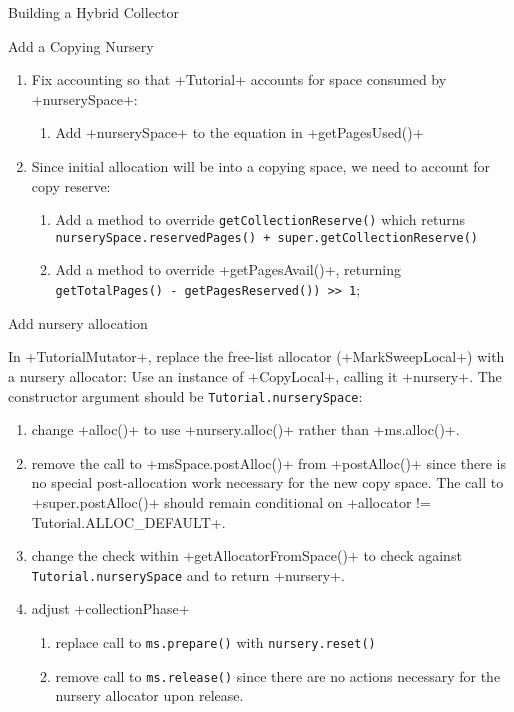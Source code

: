 \begin{section}{Building a Hybrid Collector}
\begin{subsection}{Add a Copying Nursery}
\begin{enumerate}
\begin{enumerate}
      \item Fix accounting so that \spverb+Tutorial+ accounts for space consumed by \spverb+nurserySpace+:
         \begin{enumerate}
           \item Add \spverb+nurserySpace+ to the equation in \spverb+getPagesUsed()+
         \end{enumerate}
      \item Since initial allocation will be into a copying space, we need to account for copy reserve:
         \begin{enumerate}
           \item Add a method to override \texttt{get\-Col\-lec\-tion\-Re\-serve()} which returns \texttt{nur\-se\-ry\-Spa\-ce.re\-ser\-ved\-Pa\-ges() + su\-per.get\-Col\-lec\-tion\-Re\-ser\-ve()}
           \item Add a method to override \spverb+getPagesAvail()+, returning \texttt{get\-To\-tal\-Pa\-ges() - get\-Pa\-ges\-Re\-ser\-ved()) >> 1};
         \end{enumerate}
    \end{enumerate}
\end{enumerate}

\end{subsection}

\begin{subsection}{Add nursery allocation}

In \spverb+TutorialMutator+, replace the free-list allocator (\spverb+MarkSweepLocal+) with a nursery allocator: Use an instance of \spverb+CopyLocal+, calling it \spverb+nursery+. The constructor argument should be \texttt{Tu\-to\-rial.nur\-se\-ry\-Spa\-ce}:
  \begin{enumerate}
    \item change \spverb+alloc()+ to use \spverb+nursery.alloc()+ rather than \spverb+ms.alloc()+.
    \item remove the call to \spverb+msSpace.postAlloc()+ from \spverb+postAlloc()+ since there is no special post-allocation work necessary for the new copy space. The call to \spverb+super.postAlloc()+ should remain conditional on \spverb+allocator != Tutorial.ALLOC_DEFAULT+.
    \item change the check within \spverb+getAllocatorFromSpace()+ to check against \texttt{Tu\-to\-rial.nur\-se\-ry\-Spa\-ce} and to return \spverb+nursery+.
    \item adjust \spverb+collectionPhase+
      \begin{enumerate}
        \item replace call to \verb+ms.prepare()+ with \verb+nursery.reset()+
        \item remove call to \verb+ms.release()+ since there are no actions necessary for the nursery allocator upon release.
      \end{enumerate}
  \end{enumerate}
\end{subsection}


\end{section}
